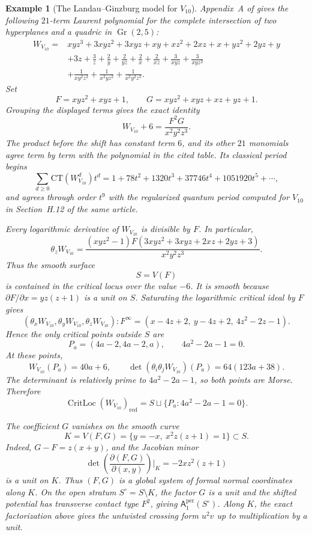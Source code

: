 \documentclass[11pt]{amsart}
\newtheorem{example}{Example}[section]
\DeclareMathOperator{\CritLoc}{CritLoc}
\newcommand{\Aper}[2]{\mathsf{A}^{\mathrm{per}}_{#2}(#1)}
\begin{document}
\begin{example}[The Landau--Ginzburg model for $V_{10}$]
Appendix~A of \cite{CoatesCortiGalkinKasprzyk2016} gives the following
$21$-term Laurent polynomial for the complete intersection of two
hyperplanes and a quadric in $\operatorname{Gr}(2,5)$:
\begin{align*}
W_{V_{10}}={}&xyz^3+3xyz^2+3xyz+xy+xz^2+2xz+x
+yz^2+2yz+y \\
&+3z+\frac3z+\frac2y+\frac2{yz}+\frac2x+\frac2{xz}
+\frac3{xyz}+\frac3{xyz^2} \\
&+\frac1{xy^2z^2}+\frac1{x^2yz^2}+\frac1{x^2y^2z^3}.
\end{align*}
Set
\[
F=xyz^2+xyz+1,
\qquad
G=xyz^2+xyz+xz+yz+1.
\]
Grouping the displayed terms gives the exact identity
\[
W_{V_{10}}+6=\frac{F^2G}{x^2y^2z^3}.
\]
The product before the shift has constant term $6$, and its other $21$
monomials agree term by term with the polynomial in the cited table. Its
classical period begins
\[
\sum_{d\geq0}\mathrm{CT}(W_{V_{10}}^d)t^d
=1+78t^2+1320t^3+37746t^4+1051920t^5+\cdots,
\]
and agrees through order $t^9$ with the regularized quantum period computed
for $V_{10}$ in Section~H.12 of the same article.

Every logarithmic derivative of $W_{V_{10}}$ is divisible by $F$. In
particular,
\[
\theta_zW_{V_{10}}
=\frac{(xyz^2-1)F(3xyz^2+3xyz+2xz+2yz+3)}{x^2y^2z^3}.
\]
Thus the smooth surface
\[
S=V(F)
\]
is contained in the critical locus over the value $-6$. It is smooth because
$\partial F/\partial x=yz(z+1)$ is a unit on $S$. Saturating the logarithmic
critical ideal by $F$ gives
\[
(\theta_xW_{V_{10}},\theta_yW_{V_{10}},\theta_zW_{V_{10}}):F^\infty
=
(x-4z+2,\ y-4z+2,\ 4z^2-2z-1).
\]
Hence the only critical points outside $S$ are
\[
P_a=(4a-2,4a-2,a),
\qquad
4a^2-2a-1=0.
\]
At these points,
\[
W_{V_{10}}(P_a)=40a+6,
\qquad
\det(\theta_i\theta_jW_{V_{10}})(P_a)=64(123a+38).
\]
The determinant is relatively prime to $4a^2-2a-1$, so both points are
Morse. Therefore
\[
\CritLoc(W_{V_{10}})_{\mathrm{red}}=S\sqcup\{P_a:4a^2-2a-1=0\}.
\]

The coefficient $G$ vanishes on the smooth curve
\[
K=V(F,G)
=\{y=-x,\ x^2z(z+1)=1\}\subset S.
\]
Indeed, $G-F=z(x+y)$, and the Jacobian minor
\[
\det\!\left(\frac{\partial(F,G)}{\partial(x,y)}\right)\bigg|_K
=-2xz^2(z+1)
\]
is a unit on $K$. Thus $(F,G)$ is a global system of formal normal
coordinates along $K$. On the open stratum $S^\circ=S\setminus K$, the factor
$G$ is a unit and the shifted potential has transverse contact type $F^2$,
giving $\Aper{S^\circ}{1}$. Along $K$, the exact factorization above gives the
untwisted crossing form $u^2v$ up to multiplication by a unit.


\end{example}
\end{document}
